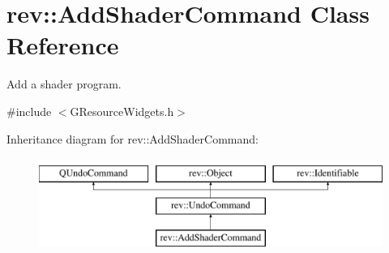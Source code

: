 \hypertarget{classrev_1_1_add_shader_command}{}\section{rev\+::Add\+Shader\+Command Class Reference}
\label{classrev_1_1_add_shader_command}


Add a shader program.  




{\ttfamily \#include $<$G\+Resource\+Widgets.\+h$>$}

Inheritance diagram for rev\+::Add\+Shader\+Command\+:\begin{figure}[H]
\begin{center}
\leavevmode
\includegraphics[height=3.000000cm]{classrev_1_1_add_shader_command}
\end{center}
\end{figure}
